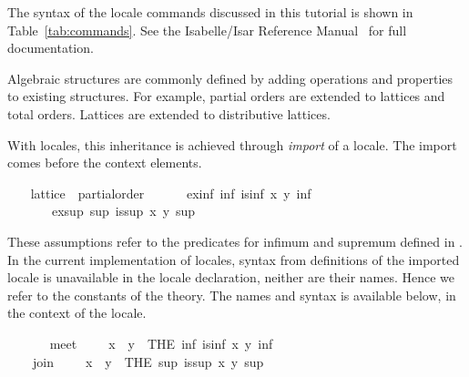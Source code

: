 \begin{isabellebody}
\begin{isamarkuptext}
  The syntax of the locale commands discussed in this tutorial is
  shown in Table~\ref{tab:commands}.  See the
  Isabelle/Isar Reference Manual~\cite{IsarRef}
  for full documentation.%
\end{isamarkuptext}%
\isamarkuptrue%
%
\isamarkuptrue%
%
\begin{isamarkuptext}%
Algebraic structures are commonly defined by adding operations and
  properties to existing structures.  For example, partial orders
  are extended to lattices and total orders.  Lattices are extended to
  distributive lattices.

  With locales, this inheritance is achieved through \emph{import} of a
  locale.  The import comes before the context elements.%
\end{isamarkuptext}%
\isamarkuptrue%
\ \ \isamarkupfalse%
\ lattice\ {\isacharequal}\ partial{\isacharunderscore}order\ {\isacharplus}\isanewline
\ \ \ \ \ ex{\isacharunderscore}inf{\isacharcolon}\ {\isachardoublequoteopen}{\isasymexists}inf{\isachardot}\ is{\isacharunderscore}inf\ x\ y\ inf{\isachardoublequoteclose}\isanewline
\ \ \ \ \ \ \ ex{\isacharunderscore}sup{\isacharcolon}\ {\isachardoublequoteopen}{\isasymexists}sup{\isachardot}\ is{\isacharunderscore}sup\ x\ y\ sup{\isachardoublequoteclose}\isanewline
\ \ %
\begin{isamarkuptext}%
These assumptions refer to the predicates for infimum
  and supremum defined in .  In the current
  implementation of locales, syntax from definitions of the imported
  locale is unavailable in the locale declaration, neither are their
  names.  Hence we refer to the constants of the theory.  The names
  and syntax is available below, in the context of the locale.%
\end{isamarkuptext}%
\isamarkuptrue%
\ \ \isamarkupfalse%
\isanewline
\ \ \ \ meet\ {\isacharparenleft}\ {\isachardoublequoteopen}{\isasymsqinter}{\isachardoublequoteclose}\ {}{}{\isacharparenright}\ \ {\isachardoublequoteopen}x\ {\isasymsqinter}\ y\ {\isacharequal}\ {\isacharparenleft}THE\ inf{\isachardot}\ is{\isacharunderscore}inf\ x\ y\ inf{\isacharparenright}{\isachardoublequoteclose}\isanewline
\isanewline
\ \ \isamarkupfalse%
\isanewline
\ \ \ \ join\ {\isacharparenleft}\ {\isachardoublequoteopen}{\isasymsqunion}{\isachardoublequoteclose}\ {}{}{\isacharparenright}\ \ {\isachardoublequoteopen}x\ {\isasymsqunion}\ y\ {\isacharequal}\ {\isacharparenleft}THE\ sup{\isachardot}\ is{\isacharunderscore}sup\ x\ y\ sup{\isacharparenright}{\isachardoublequoteclose}\isanewline

\end{isabellebody}
